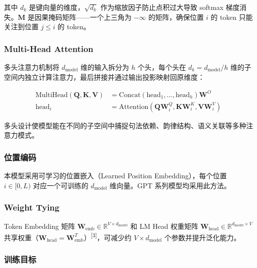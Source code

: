 \documentclass[a4paper, 12pt, centering, AutoFakeBold]{article}
\begin{document}
其中 $d_k$ 是键向量的维度，$\sqrt{d_k}$ 作为缩放因子防止点积过大导致 softmax 梯度消失。$\mathbf{M}$ 是因果掩码矩阵——一个上三角为 $-\infty$ 的矩阵，确保位置 $i$ 的 token 只能关注到位置 $j \leq i$ 的 token。

\subsubsection{Multi-Head Attention}

多头注意力机制将 $d_{\text{model}}$ 维的输入拆分为 $h$ 个头，每个头在 $d_k = d_{\text{model}} / h$ 维的子空间内独立计算注意力，最后拼接并通过输出投影映射回原维度：

\begin{equation} \label{eq:mha}
\begin{aligned}
\text{MultiHead}(\mathbf{Q}, \mathbf{K}, \mathbf{V}) &= \text{Concat}(\text{head}_1, \ldots, \text{head}_h)\mathbf{W}^O \\
\text{head}_i &= \text{Attention}(\mathbf{Q}\mathbf{W}_i^Q, \mathbf{K}\mathbf{W}_i^K, \mathbf{V}\mathbf{W}_i^V)
\end{aligned}
\end{equation}

多头设计使模型能在不同的子空间中捕捉句法依赖、韵律结构、语义关联等多种注意力模式。

\subsubsection{位置编码}

本模型采用可学习的位置嵌入（Learned Position Embedding），每个位置 $i \in [0, L)$ 对应一个可训练的 $d_{\text{model}}$ 维向量。GPT 系列模型均采用此方法。

\subsubsection{Weight Tying}

Token Embedding 矩阵 $\mathbf{W}_{\text{emb}} \in \mathbb{R}^{V \times d_{\text{model}}}$ 和 LM Head 权重矩阵 $\mathbf{W}_{\text{head}} \in \mathbb{R}^{d_{\text{model}} \times V}$ 共享权重（$\mathbf{W}_{\text{head}} = \mathbf{W}_{\text{emb}}^T$）\textsuperscript{[3]}，可减少约 $V \times d_{\text{model}}$ 个参数并提升泛化能力。

\subsubsection{训练目标}
\end{document}
